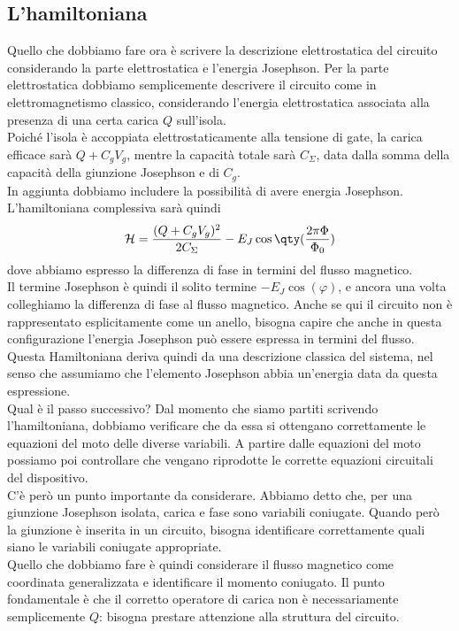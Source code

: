 \subsection{L'hamiltoniana}
Quello che dobbiamo fare ora è scrivere la descrizione elettrostatica del circuito considerando la parte elettrostatica e l'energia Josephson. Per la parte elettrostatica dobbiamo semplicemente descrivere il circuito come in elettromagnetismo classico, considerando l'energia elettrostatica associata alla presenza di una certa carica $Q$ sull'isola.\\
Poiché l'isola è accoppiata elettrostaticamente alla tensione di gate, la carica efficace sarà $Q + C_g V_g$, mentre la capacità totale sarà $C_\Sigma$, data dalla somma della capacità della giunzione Josephson e di $C_g$.\\
In aggiunta dobbiamo includere la possibilità di avere energia Josephson. L'hamiltoniana complessiva sarà quindi
\begin{equation*}
    \mathcal{H}=\frac{(Q + C_g V_g)^2}{2 C_{\Sigma}} - E_J \cos{ \qty( \frac{2 \pi \Phi}{\Phi_0} ) }
\end{equation*}
dove abbiamo espresso la differenza di fase in termini del flusso magnetico.\\
Il termine Josephson è quindi il solito termine $- E_J \cos(\varphi)$, e ancora una volta colleghiamo la differenza di fase al flusso magnetico. Anche se qui il circuito non è rappresentato esplicitamente come un anello, bisogna capire che anche in questa configurazione l'energia Josephson può essere espressa in termini del flusso.\\
Questa Hamiltoniana deriva quindi da una descrizione classica del sistema, nel senso che assumiamo che l'elemento Josephson abbia un'energia data da questa espressione.\\
Qual è il passo successivo? Dal momento che siamo partiti scrivendo l'hamiltoniana, dobbiamo verificare che da essa si ottengano correttamente le equazioni del moto delle diverse variabili. A partire dalle equazioni del moto possiamo poi controllare che vengano riprodotte le corrette equazioni circuitali del dispositivo.\\
C'è però un punto importante da considerare. Abbiamo detto che, per una giunzione Josephson isolata, carica e fase sono variabili coniugate. Quando però la giunzione è inserita in un circuito, bisogna identificare correttamente quali siano le variabili coniugate appropriate.\\
Quello che dobbiamo fare è quindi considerare il flusso magnetico come coordinata generalizzata e identificare il momento coniugato. Il punto fondamentale è che il corretto operatore di carica non è necessariamente semplicemente $Q$: bisogna prestare attenzione alla struttura del circuito.\\
